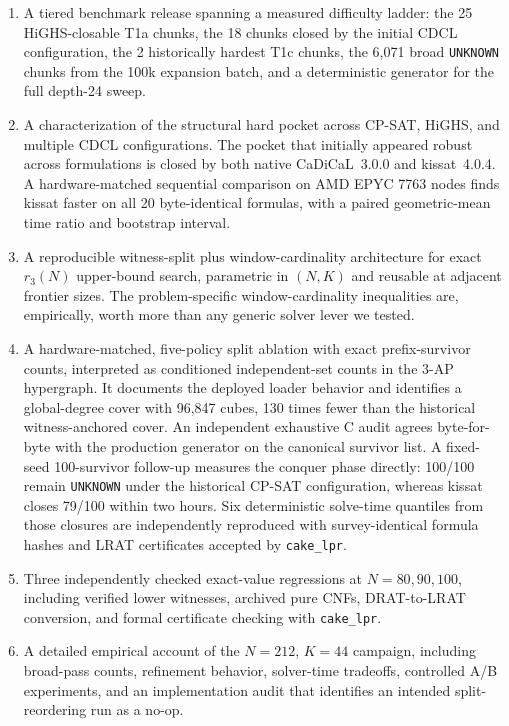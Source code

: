 \begin{enumerate}
\def\labelenumi{\arabic{enumi}.}
\tightlist
\item
  A tiered benchmark release spanning a measured difficulty ladder: the
  25 HiGHS-closable T1a chunks, the 18 chunks closed by the initial
  CDCL configuration, the 2 historically hardest T1c chunks, the 6,071
  broad \texttt{UNKNOWN} chunks from the 100k
  expansion batch, and a deterministic generator for the full
  depth-24 sweep.
\item
  A characterization of the structural hard pocket across CP-SAT, HiGHS,
  and multiple CDCL configurations. The pocket that initially appeared
  robust across formulations is closed by both native CaDiCaL~3.0.0 and
  kissat~4.0.4. A hardware-matched sequential comparison on AMD EPYC 7763
  nodes finds kissat faster on all 20 byte-identical formulas, with a paired
  geometric-mean time ratio and bootstrap interval.
\item
  A reproducible witness-split plus window-cardinality architecture for
  exact $r_3(N)$ upper-bound search, parametric in $(N, K)$
  and reusable at adjacent frontier sizes. The problem-specific
  window-cardinality inequalities are, empirically, worth more than any
  generic solver lever we tested.
\item
  A hardware-matched, five-policy split ablation with exact prefix-survivor
  counts, interpreted as conditioned independent-set counts in the 3-AP
  hypergraph. It documents the deployed loader behavior and identifies a
  global-degree cover with 96,847 cubes, 130 times fewer than the historical
  witness-anchored cover. An independent exhaustive C audit agrees
  byte-for-byte with the production generator on the canonical survivor list.
  A fixed-seed 100-survivor follow-up measures the
  conquer phase directly: 100/100 remain \texttt{UNKNOWN} under the historical
  CP-SAT configuration, whereas kissat closes 79/100 within two hours. Six
  deterministic solve-time quantiles from those closures are independently
  reproduced with survey-identical formula hashes and LRAT certificates
  accepted by \texttt{cake\_lpr}.
\item
  Three independently checked exact-value regressions at $N=80,90,100$,
  including verified lower witnesses, archived pure CNFs, DRAT-to-LRAT
  conversion, and formal certificate checking with \texttt{cake\_lpr}.
\item
  A detailed empirical account of the $N = 212$, $K = 44$ campaign, including
  broad-pass counts, refinement behavior, solver-time tradeoffs, controlled
  A/B experiments, and an implementation audit that identifies an intended
  split-reordering run as a no-op.
\end{enumerate}

